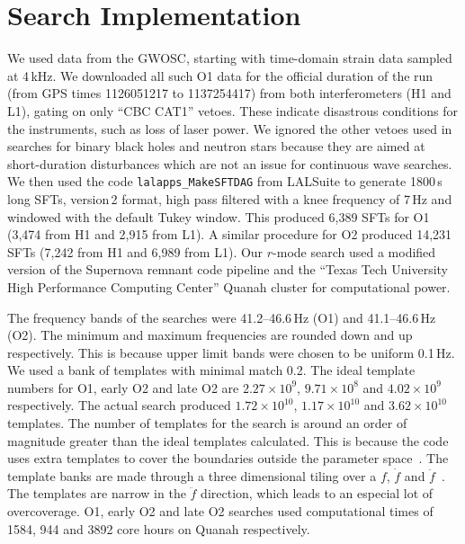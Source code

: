 \documentclass{ttuthes2007}
\begin{document}
\section{Search Implementation} 
We used data from the \ac{GWOSC}, starting with time-domain strain data sampled
at 4\,kHz.  We downloaded all such \ac{O1} data for the official duration of the
run (from GPS times 1126051217 to 1137254417) from both interferometers (H1 and
L1), gating on only ``CBC CAT1'' vetoes. These indicate disastrous conditions
for the instruments, such as loss of laser power. We ignored the other vetoes
used in searches for binary black holes and neutron stars because they are aimed
at short-duration disturbances which are not an issue for continuous wave
searches.  We then used the code \texttt{lalapps\_MakeSFTDAG} from LALSuite to
generate 1800\,s long \acp{SFT}, version\,2 format, high pass filtered with a knee
frequency of 7\,Hz and windowed with the default Tukey window. This produced
6,389 \acp{SFT} for \ac{O1} (3,474 from H1 and 2,915 from L1). A similar
procedure for \ac{O2} produced 14,231 \acp{SFT} (7,242 from H1 and 6,989 from
L1). Our $r$-mode search used a modified version of the Supernova remnant
code pipeline\cite{Aasi_2015} and the ``Texas Tech University High Performance Computing
Center'' Quanah cluster for computational power.

The frequency bands of the searches were 41.2--46.6\,Hz (O1) and 41.1--46.6\,Hz
(O2). The minimum and maximum frequencies are rounded down and up respectively.
This is because upper limit bands were chosen to be uniform  0.1\,Hz. We used a
bank of templates with minimal match 0.2. The ideal template numbers for O1,
early O2 and late O2 are $2.27\times 10^9$, $9.71\times 10^8$ and $4.02\times
10^9$ respectively. The actual search produced $1.72\times 10^{10}$, $1.17\times
10^{10}$ and $3.62 \times 10^{10}$ templates. The number of templates for the
search is around an order of magnitude greater than the ideal templates
calculated. This is because the code uses extra templates to cover the
boundaries outside the parameter space~\cite{Abadie_2010}. The template banks
are made through a three dimensional tiling over a $f$, $\dot{f}$ and
$\ddot{f}$~\cite{Wette:2009uea}. The templates are narrow in the $\ddot{f}$
direction, which leads to an especial lot of overcoverage. O1, early O2 and late
O2 searches used computational times of 1584, 944 and 3892 core hours on Quanah
respectively.
\end{document}
